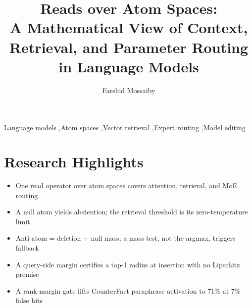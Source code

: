 \documentclass[preprint,12pt]{elsarticle}
\begin{document}
\begin{frontmatter}

\title{Reads over Atom Spaces:\\
A Mathematical View of Context, Retrieval, and Parameter Routing in Language Models}

\author[inst1]{Farshid Mossaiby}

\begin{keyword}
Language models \sep Atom spaces \sep Vector retrieval \sep Expert routing \sep Model editing
\end{keyword}

\end{frontmatter}

\section*{Research Highlights}

\begin{itemize}
  \item One read operator over atom spaces covers attention, retrieval, and MoE routing
  \item A null atom yields abstention; the retrieval threshold is its zero-temperature limit
  \item Anti-atom = deletion + null mass; a mass test, not the argmax, triggers fallback
  \item A query-side margin certifies a top-1 radius at insertion with no Lipschitz premise
  \item A rank-margin gate lifts CounterFact paraphrase activation to 71\% at 7\% false hits
\end{itemize}
\end{document}
